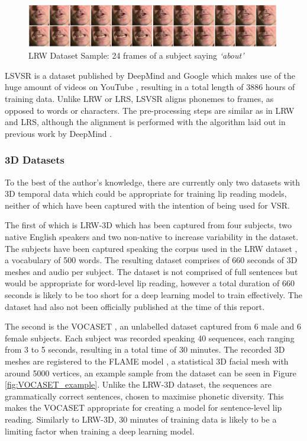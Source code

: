 \begin{figure}[h]
    \centering
        \includegraphics[width=0.99\textwidth]{figures/lrw_one_second.png}
    \caption{LRW Dataset Sample: 24 frames of a subject saying \textit{`about'} \cite{Chung2016}}\label{fig:LRW_One_Second}
\end{figure}

LSVSR is a dataset published by DeepMind and Google which makes use of the huge amount of videos on YouTube \cite{Shillingford2018}, resulting in a total length of 3886 hours of training data.
Unlike LRW or LRS, LSVSR aligns phonemes to frames, as opposed to words or characters.
The pre-processing steps are similar as in LRW and LRS, although the alignment is performed with the algorithm laid out in previous work by DeepMind \cite{Liao2013}.

\subsubsection{3D Datasets} \label{3D Datasets}
To the best of the author's knowledge, there are currently only two datasets with 3D temporal data which could be appropriate for training lip reading models, neither of which have been captured with the intention of being used for VSR.

The first of which is LRW-3D \cite{Tzirakis2019} which has been captured from four subjects, two native English speakers and two non-native to increase variability in the dataset.
The subjects have been captured speaking the corpus used in the LRW dataset \cite{Chung2016}, a vocabulary of 500 words.
The resulting dataset comprises of 660 seconds of 3D meshes and audio per subject.
The dataset is not comprised of full sentences but would be appropriate for word-level lip reading, however a total duration of 660 seconds is likely to be too short for a deep learning model to train effectively.
The dataset had also not been officially published at the time of this report.

The second is the VOCASET \cite{Cudeiro2019}, an unlabelled dataset captured from 6 male and 6 female subjects.
Each subject was recorded speaking 40 sequences, each ranging from 3 to 5 seconds, resulting in a total time of 30 minutes.
The recorded 3D meshes are registered to the FLAME model \cite{Li2017}, a statistical 3D facial mesh with around 5000 vertices, an example sample from the dataset can be seen in Figure \ref{fig:VOCASET_example}.
Unlike the LRW-3D dataset, the sequences are grammatically correct sentences, chosen to maximise phonetic diversity.
This makes the VOCASET appropriate for creating a model for sentence-level lip reading.
Similarly to LRW-3D, 30 minutes of training data is likely to be a limiting factor when training a deep learning model.

